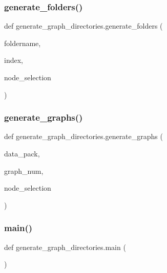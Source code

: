 \subsubsection{\texorpdfstring{generate\+\_\+folders()}{generate\_folders()}}
{\footnotesize\ttfamily def generate\+\_\+graph\+\_\+directories.\+generate\+\_\+folders (\begin{DoxyParamCaption}\item[{}]{foldername,  }\item[{}]{index,  }\item[{}]{node\+\_\+selection }\end{DoxyParamCaption})}

\mbox{\label{namespacegenerate__graph__directories_ae23e1312dfaf38532e06d36b044dceb2_ae23e1312dfaf38532e06d36b044dceb2}} 
\subsubsection{\texorpdfstring{generate\+\_\+graphs()}{generate\_graphs()}}
{\footnotesize\ttfamily def generate\+\_\+graph\+\_\+directories.\+generate\+\_\+graphs (\begin{DoxyParamCaption}\item[{}]{data\+\_\+pack,  }\item[{}]{graph\+\_\+num,  }\item[{}]{node\+\_\+selection }\end{DoxyParamCaption})}

\mbox{\label{namespacegenerate__graph__directories_a795922cdebd688d258a7363909b257bc_a795922cdebd688d258a7363909b257bc}} 
\subsubsection{\texorpdfstring{main()}{main()}}
{\footnotesize\ttfamily def generate\+\_\+graph\+\_\+directories.\+main (\begin{DoxyParamCaption}{ }\end{DoxyParamCaption})}

